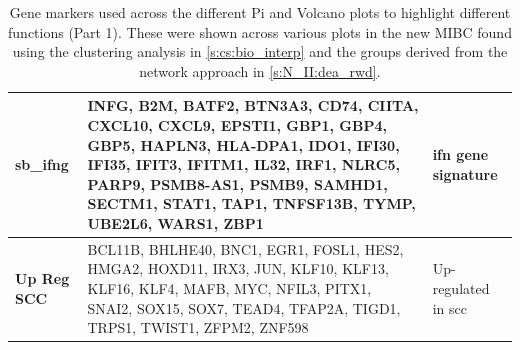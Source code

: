 \begin{table}[H]
\begin{tabularx}{\textwidth}{>{\hsize=0.6\hsize}X|>{\hsize=1.4\hsize}X|>{\hsize=1\hsize}X}
        \midrule
        \textbf{sb\_ifng} & INFG, B2M, BATF2, BTN3A3, CD74, CIITA, CXCL10, CXCL9, EPSTI1, GBP1, GBP4, GBP5, HAPLN3, HLA-DPA1, IDO1, IFI30, IFI35, IFIT3, IFITM1, IL32, IRF1, NLRC5, PARP9, PSMB8-AS1, PSMB9, SAMHD1, SECTM1, STAT1, TAP1, TNFSF13B, TYMP, UBE2L6, WARS1, ZBP1 & \acrfull{ifn} gene signature \citep{Baker2022-bj} \\
        \midrule
        \textbf{Up Reg SCC} & BCL11B, BHLHE40, BNC1, EGR1, FOSL1, HES2, HMGA2, HOXD11, IRX3, JUN, KLF10, KLF13, KLF16, KLF4, MAFB, MYC, NFIL3, PITX1, SNAI2, SOX15, SOX7, TEAD4, TFAP2A, TIGD1, TRPS1, TWIST1, ZFPM2, ZNF598 & Up-regulated in \acrfull{scc} \citep{Hurst2022-sp} \\
        \bottomrule
    \end{tabularx}
    \caption{Gene markers used across the different Pi and Volcano plots to highlight different functions (Part 1). These were shown across various plots in the new MIBC found using the clustering analysis in \cref{s:cs:bio_interp} and the groups derived from the network approach in \cref{s:N_II:dea_rwd}. }
    \label{tab:ap:pi_genes_1}
\end{table}


